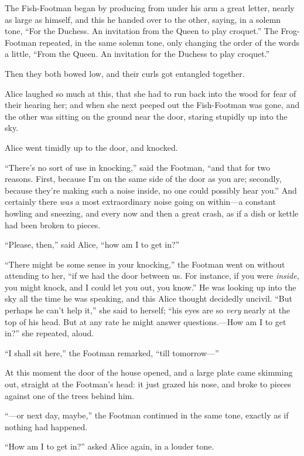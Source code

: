 \documentclass[11pt,openany,oneside]{book}
\begin{document}
The Fish-Footman began by producing from under his arm a great letter, nearly as large as himself, and this he handed over to the other, saying, in a solemn tone, “For the Duchess. An invitation from the Queen to play croquet.” The Frog-Footman repeated, in the same solemn tone, only changing the order of the words a little, “From the Queen. An invitation for the Duchess to play croquet.” 

Then they both bowed low, and their curls got entangled together. 

Alice laughed so much at this, that she had to run back into the wood for fear of their hearing her; and when she next peeped out the Fish-Footman was gone, and the other was sitting on the ground near the door, staring stupidly up into the sky. 

Alice went timidly up to the door, and knocked. 

“There’s no sort of use in knocking,” said the Footman, “and that for two reasons. First, because I’m on the same side of the door as you are; secondly, because they’re making such a noise inside, no one could possibly hear you.” And certainly there {\em was\/} a most extraordinary noise going on within—a constant howling and sneezing, and every now and then a great crash, as if a dish or kettle had been broken to pieces. 

“Please, then,” said Alice, “how am I to get in?” 

“There might be some sense in your knocking,” the Footman went on without attending to her, “if we had the door between us. For instance, if you were {\em inside\/}, you might knock, and I could let you out, you know.” He was looking up into the sky all the time he was speaking, and this Alice thought decidedly uncivil. “But perhaps he can’t help it,” she said to herself; “his eyes are so {\em very\/} nearly at the top of his head. But at any rate he might answer questions.—How am I to get in?” she repeated, aloud. 

“I shall sit here,” the Footman remarked, “till tomorrow—” 

At this moment the door of the house opened, and a large plate came skimming out, straight at the Footman’s head: it just grazed his nose, and broke to pieces against one of the trees behind him. 

“—or next day, maybe,” the Footman continued in the same tone, exactly as if nothing had happened. 

“How am I to get in?” asked Alice again, in a louder tone. 
\end{document}
